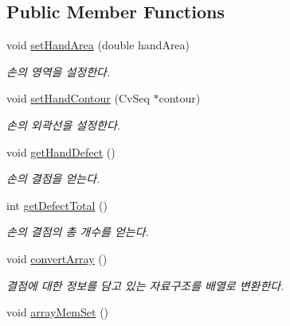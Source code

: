 \subsection*{Public Member Functions}
\begin{DoxyCompactItemize}
\item 
\hypertarget{class_fk_hand_a5520c650d0914adce8c3a870c07fad29}{}void \hyperlink{class_fk_hand_a5520c650d0914adce8c3a870c07fad29}{set\+Hand\+Area} (double hand\+Area)\label{class_fk_hand_a5520c650d0914adce8c3a870c07fad29}

\begin{DoxyCompactList}\small\item\em 손의 영역을 설정한다. \end{DoxyCompactList}\item 
\hypertarget{class_fk_hand_a01e4abd2930984381bc3f7739bf1b736}{}void \hyperlink{class_fk_hand_a01e4abd2930984381bc3f7739bf1b736}{set\+Hand\+Contour} (Cv\+Seq $\ast$contour)\label{class_fk_hand_a01e4abd2930984381bc3f7739bf1b736}

\begin{DoxyCompactList}\small\item\em 손의 외곽선을 설정한다. \end{DoxyCompactList}\item 
\hypertarget{class_fk_hand_aa20d58faf6dcc583fbba02cd7c7b1f11}{}void \hyperlink{class_fk_hand_aa20d58faf6dcc583fbba02cd7c7b1f11}{get\+Hand\+Defect} ()\label{class_fk_hand_aa20d58faf6dcc583fbba02cd7c7b1f11}

\begin{DoxyCompactList}\small\item\em 손의 결점을 얻는다. \end{DoxyCompactList}\item 
\hypertarget{class_fk_hand_a49ee43b826e2a8f02c32ee837cdd0929}{}int \hyperlink{class_fk_hand_a49ee43b826e2a8f02c32ee837cdd0929}{get\+Defect\+Total} ()\label{class_fk_hand_a49ee43b826e2a8f02c32ee837cdd0929}

\begin{DoxyCompactList}\small\item\em 손의 결점의 총 개수를 얻는다. \end{DoxyCompactList}\item 
\hypertarget{class_fk_hand_a334e67e116b2164c907c65d03f939e40}{}void \hyperlink{class_fk_hand_a334e67e116b2164c907c65d03f939e40}{convert\+Array} ()\label{class_fk_hand_a334e67e116b2164c907c65d03f939e40}

\begin{DoxyCompactList}\small\item\em 결점에 대한 정보를 담고 있는 자료구조를 배열로 변환한다. \end{DoxyCompactList}\item 
\hypertarget{class_fk_hand_aab29c2d0ded17f7657b08d96441a4ca0}{}void \hyperlink{class_fk_hand_aab29c2d0ded17f7657b08d96441a4ca0}{array\+Mem\+Set} ()\label{class_fk_hand_aab29c2d0ded17f7657b08d96441a4ca0}


\end{DoxyCompactItemize}
